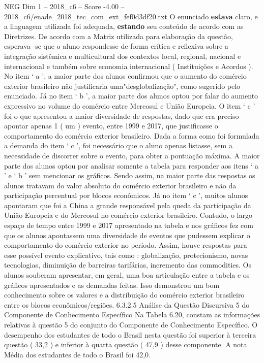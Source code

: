 \begin{textsample}{NEG Dim 1 – 2018\_c6 – Score -4.00 – 2018\_c6/enade\_2018\_tec\_com\_ext\_fef0d3df20.txt}
O enunciado \textbf{estava} claro, e a linguagem utilizada foi adequada, \textbf{estando} seu conteúdo de acordo com as Diretrizes.
De acordo com a Matriz utilizada para elaboração da questão, esperava -se que o aluno respondesse de forma crítica e reflexiva sobre a integração sistêmica e multicultural dos contextos local, regional, nacional e internacional e também sobre economia internacional ( Instituições e Acordos ).
No item ‘ a ’, a maior parte dos alunos confirmou que o aumento do comércio exterior brasileiro não justificaria uma"desglobalização", como sugerido pelo enunciado.
Já no item ‘ b ’, a maior parte dos alunos optou por falar do aumento expressivo no volume do comércio entre Mercosul e União Europeia.
O item ‘ c ’ foi o que apresentou a maior diversidade de respostas, dado que era preciso apontar apenas 1 ( um ) evento, entre 1999 e 2017, que justificasse o comportamento do comércio exterior brasileiro.
Dada a forma como foi formulada a demanda do item ‘ c ’, foi necessário que o aluno apenas listasse, sem a necessidade de discorrer sobre o evento, para obter a pontuação máxima.
A maior parte dos alunos optou por analisar somente a tabela para responder aos itens ‘ a ’ e ‘ b ’ sem mencionar os gráficos.
Sendo assim, na maior parte das respostas os alunos tratavam do valor absoluto do comércio exterior brasileiro e não da participação percentual por blocos econômicos.
Já no item ‘ c ’, muitos alunos apontaram que foi a China a grande responsável pela queda da participação da União Europeia e do Mercosul no comércio exterior brasileiro.
Contudo, o largo espaço de tempo entre 1999 e 2017 apresentado na tabela e nos gráficos fez com que os alunos apontassem uma diversidade de eventos que pudessem explicar o comportamento do comércio exterior no período.
Assim, houve respostas para esse possível evento explicativo, tais como : globalização, protecionismo, novas tecnologias, diminuição de barreiras tarifárias, incremento das commodities.
Os alunos souberam apresentar, em geral, uma boa articulação entre a tabela e os gráficos apresentados e as demandas feitas.
Isso demonstrou um bom conhecimento sobre os valores e a distribuição do comércio exterior brasileiro entre os blocos econômicos/regiões. 6.3.2.5 Análise da Questão Discursiva 5 do Componente de Conhecimento Específico Na Tabela 6.20, constam as informações relativas à questão 5 do conjunto do Componente de Conhecimento Específico.
O desempenho dos estudantes de todo o Brasil nesta questão foi superior à terceira questão ( 33,2 ) e inferior à quarta questão ( 47,9 ) desse componente.
A nota Média dos estudantes de todo o Brasil foi 42,0.

\end{textsample}
